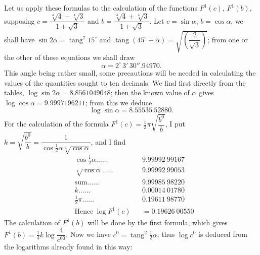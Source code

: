 \documentclass{article}
\begin{document}
Let us apply these formulas to the calculation of the functions $F^{1}(c)$, $F^{1}(b)$, supposing $c=\dfrac{\sqrt[4]{4}-\sqrt[4]{3}}{1+\sqrt{3}}$ and $b=\dfrac{\sqrt[4]{4}+\sqrt[4]{3}}{1+\sqrt{3}}$. Let $c=\sin\alpha$, $b=\cos\alpha$, we shall have $\sin 2\alpha=\operatorname{tang}^{2}15^{\circ}$ and $\operatorname{tang}(45^{\circ}+\alpha)=\sqrt{\left(\dfrac{2}{\sqrt{3}}\right)}$; from one or the other of these equations we shall draw
\[ \alpha=2^{\circ}\,3'\,30''.94970. \]
This angle being rather small, some precautions will be needed in calculating the values of the quantities sought to ten decimals. We find first directly from the tables, $\log\sin 2\alpha=8.8561049048$; then the known value of $\alpha$ gives $\log\cos\alpha=9.9997196211$; from this we deduce
\[ \log\sin\alpha=8.55535\ 52880. \]
For the calculation of the formula $F^{1}(c)=\frac{1}{2}\pi\sqrt{\dfrac{b^{0}}{b}}$, I put $k=\sqrt{\dfrac{b^{0}}{b}}=\dfrac{1}{\cos\frac{1}{2}\alpha\sqrt[4]{\cos\alpha}}$, and I find
\[ \begin{aligned} &\cos\tfrac{1}{2}\alpha\ldots\ldots && 9.99992\ 99167\\ &\sqrt[4]{\cos\alpha}\ldots\ldots && 9.99992\ 99053\\ &\text{sum}\ldots\ldots && 9.99985\ 98220\\ &k\ldots\ldots && 0.00014\ 01780\\ &\tfrac{1}{2}\pi\ldots\ldots && 0.19611\ 98770\\ &\text{Hence}\ \log F^{1}(c) && =0.19626\ 00550 \end{aligned} \]
The calculation of $F^{1}(b)$ will be done by the first formula, which gives $F^{1}(b)=\frac{1}{4}k\log\dfrac{4}{c^{00}}$. Now we have $c^{0}=\operatorname{tang}^{2}\frac{1}{2}\alpha$; thus $\log c^{0}$ is deduced from the logarithms already found in this way:
\end{document}

